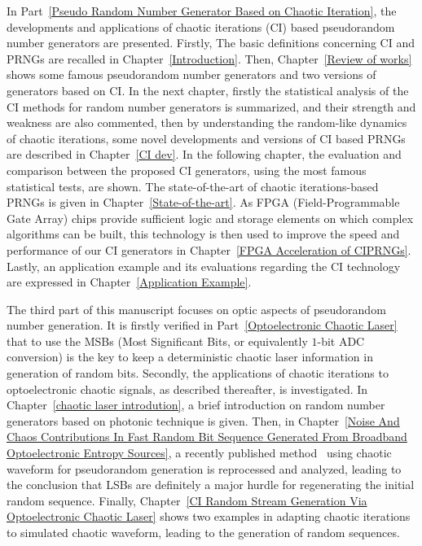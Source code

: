 In Part~\ref{Pseudo Random Number Generator Based on Chaotic Iteration}, the developments and applications of  chaotic iterations (CI) based pseudorandom number generators are presented. Firstly, The basic definitions concerning CI and PRNGs are recalled in Chapter~\ref{Introduction}. Then, Chapter~\ref{Review of works} shows some famous pseudorandom number generators and two versions of generators based on CI. In the next chapter, firstly the statistical analysis of the CI methods for random number generators is summarized, and their strength and weakness are also commented, then by understanding the random-like dynamics of chaotic iterations, some novel developments and versions of CI based PRNGs are described in Chapter~\ref{CI dev}. In the following chapter, %
 the evaluation and comparison between the proposed CI generators, using the most famous statistical tests, are shown. 
The state-of-the-art of chaotic iterations-based PRNGs is given in Chapter~\ref{State-of-the-art}.
As FPGA (Field-Programmable Gate Array) chips provide sufficient logic and storage elements on which complex algorithms can be built, this technology is then used to improve the speed and performance of our CI generators in Chapter~\ref{FPGA Acceleration of CIPRNGs}. Lastly, 
an application example and its evaluations regarding the CI technology are expressed in Chapter~\ref{Application Example}.

The third part of this manuscript focuses on optic aspects of pseudorandom number generation. It is firstly verified in Part~\ref{Optoelectronic Chaotic Laser} that to use the MSBs (Most Significant Bits, or equivalently $1$-bit ADC conversion) is the key to keep a deterministic chaotic laser information in generation of random bits. Secondly, the applications of chaotic iterations to optoelectronic chaotic signals, as described
thereafter, is investigated. In Chapter~\ref{chaotic laser introdution}, a brief introduction on random number generators based on photonic technique is given. Then, in Chapter~\ref{Noise And Chaos Contributions In Fast Random Bit Sequence Generated From Broadband Optoelectronic Entropy Sources}, a recently published method~\cite{ultrafast2009, ultrafast2010} using chaotic waveform for pseudorandom generation is reprocessed and analyzed, leading to the conclusion that LSBs are definitely a major hurdle for regenerating the initial random sequence. Finally, Chapter~\ref{CI Random Stream Generation Via Optoelectronic Chaotic Laser} shows two examples in adapting chaotic iterations to simulated chaotic waveform, leading to the generation of random sequences.

